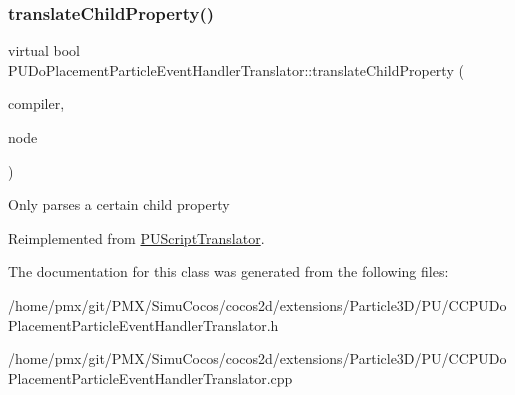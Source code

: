 \subsubsection{\texorpdfstring{translate\+Child\+Property()}{translateChildProperty()}\hspace{0.1cm}{\footnotesize\ttfamily [2/2]}}
{\footnotesize\ttfamily virtual bool P\+U\+Do\+Placement\+Particle\+Event\+Handler\+Translator\+::translate\+Child\+Property (\begin{DoxyParamCaption}\item[{\hyperlink{classPUScriptCompiler}{P\+U\+Script\+Compiler} $\ast$}]{compiler,  }\item[{\hyperlink{classPUAbstractNode}{P\+U\+Abstract\+Node} $\ast$}]{node }\end{DoxyParamCaption})\hspace{0.3cm}{\ttfamily [virtual]}}

Only parses a certain child property 

Reimplemented from \hyperlink{classPUScriptTranslator_a0374d83a8a04e57918975d525e0f8fe8}{P\+U\+Script\+Translator}.



The documentation for this class was generated from the following files\+:\begin{DoxyCompactItemize}
\item 
/home/pmx/git/\+P\+M\+X/\+Simu\+Cocos/cocos2d/extensions/\+Particle3\+D/\+P\+U/C\+C\+P\+U\+Do\+Placement\+Particle\+Event\+Handler\+Translator.\+h\item 
/home/pmx/git/\+P\+M\+X/\+Simu\+Cocos/cocos2d/extensions/\+Particle3\+D/\+P\+U/C\+C\+P\+U\+Do\+Placement\+Particle\+Event\+Handler\+Translator.\+cpp\end{DoxyCompactItemize}
